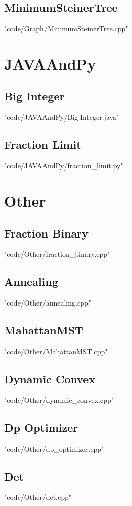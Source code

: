 \documentclass [8pt,a4paper,twocolumn]{article}
\begin{document}
\subsection{MinimumSteinerTree}
 {"code/Graph/MinimumSteinerTree.cpp"}
\section{JAVAAndPy}
\subsection{Big Integer}
 {"code/JAVAAndPy/Big Integer.java"}
\subsection{Fraction Limit}
 {"code/JAVAAndPy/fraction_limit.py"}
\section{Other}
\subsection{Fraction Binary}
 {"code/Other/fraction_binary.cpp"}
\subsection{Annealing}
 {"code/Other/annealing.cpp"}
\subsection{MahattanMST}
 {"code/Other/MahattanMST.cpp"}
\subsection{Dynamic Convex}
 {"code/Other/dynamic_convex.cpp"}
\subsection{Dp Optimizer}
 {"code/Other/dp_optimizer.cpp"}
\subsection{Det}
 {"code/Other/det.cpp"}
\end{document}
